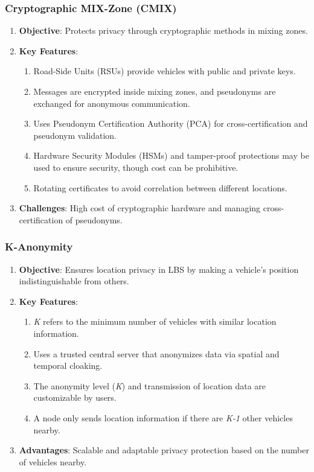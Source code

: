 \subsubsection{Cryptographic MIX-Zone (CMIX)}
\begin{enumerate}
    \item \textbf{Objective}: Protects privacy through cryptographic methods in mixing zones.
    \item \textbf{Key Features}:
    \begin{enumerate}
        \item Road-Side Units (RSUs) provide vehicles with public and private keys.
        \item Messages are encrypted inside mixing zones, and pseudonyms are exchanged for anonymous communication.
        \item Uses Pseudonym Certification Authority (PCA) for cross-certification and pseudonym validation.
        \item Hardware Security Modules (HSMs) and tamper-proof protections may be used to ensure security, though cost can be prohibitive.
        \item Rotating certificates to avoid correlation between different locations.
    \end{enumerate}
    \item \textbf{Challenges}: High cost of cryptographic hardware and managing cross-certification of pseudonyms.
\end{enumerate}

\subsubsection{K-Anonymity}
\begin{enumerate}
    \item \textbf{Objective}: Ensures location privacy in LBS by making a vehicle’s position indistinguishable from others.
    \item \textbf{Key Features}:
    \begin{enumerate}
        \item \emph{K} refers to the minimum number of vehicles with similar location information.
        \item Uses a trusted central server that anonymizes data via spatial and temporal cloaking.
        \item The anonymity level (\emph{K}) and transmission of location data are customizable by users.
        \item A node only sends location information if there are \emph{K-1} other vehicles nearby.
    \end{enumerate}
    \item \textbf{Advantages}: Scalable and adaptable privacy protection based on the number of vehicles nearby.
\end{enumerate}

